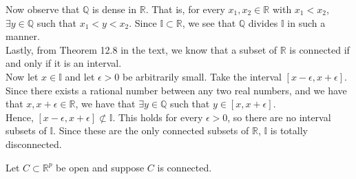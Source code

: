 \documentclass[12pt]{article}
\newenvironment{problem}[2][Problem]{\begin{trivlist}
\item[\hskip \labelsep {\bfseries #1}\hskip \labelsep {\bfseries #2.}]}{\end{trivlist}}
\begin{document}
Now observe that $\mathbb{Q}$ is dense in $\mathbb{R}$. That is, for every $x_1, x_2 \in \mathbb{R}$ with $x_1 < x_2$, $\exists y \in \mathbb{Q}$ such that $x_1 < y < x_2$. Since $\mathbb{I} \subset \mathbb{R}$, we see that $\mathbb{Q}$ divides $\mathbb{I}$ in such a manner.\\

Lastly, from Theorem 12.8 in the text, we know that a subset of $\mathbb{R}$ is connected if and only if it is an interval.\\

Now let $x \in \mathbb{I}$ and let $\epsilon > 0$ be arbitrarily small. Take the interval $[x - \epsilon, x + \epsilon]$. Since there exists a rational number between any two real numbers, and we have that $x, x + \epsilon \in \mathbb{R}$, we have that $\exists y \in \mathbb{Q}$ such that $y \in [x, x + \epsilon]$.\\

Hence, $[x - \epsilon, x + \epsilon] \not\subset \mathbb{I}$. This holds for every $\epsilon > 0$, so there are no interval subsets of $\mathbb{I}$. Since these are the only connected subsets of $\mathbb{R}$, $\mathbb{I}$ is totally disconnected.

\begin{problem}{3}
\end{problem}

Let $C \subset \mathbb{R}^p$ be open and suppose $C$ is connected.

\begin{problem}{4}
\end{problem}

\begin{problem}{5}
\end{problem}
\end{document}
